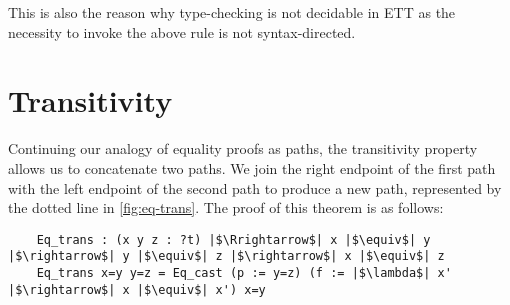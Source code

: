 \documentclass[12pt,twoside,maitrise]{dms}
\theoremstyle{definition}
\numberwithin{equation}{section}
\numberwithin{table}{chapter}
\numberwithin{figure}{chapter}
\begin{document}
\begin{prooftree*}
\end{prooftree*}

This is also the reason why type-checking is not decidable in ETT as the
necessity to invoke the above rule is not syntax-directed.

\section{Transitivity}\label{sec:eqtransitivity}
Continuing our analogy of equality proofs as paths, the transitivity property
allows us to concatenate two paths. We join the right endpoint of the first path
with the left endpoint of the second path to produce a new path, represented by
the dotted line in \autoref{fig:eq-trans}. The proof of this theorem is as
follows:

\begin{verbatim}
    Eq_trans : (x y z : ?t) |$\Rrightarrow$| x |$\equiv$| y |$\rightarrow$| y |$\equiv$| z |$\rightarrow$| x |$\equiv$| z
    Eq_trans x=y y=z = Eq_cast (p := y=z) (f := |$\lambda$| x' |$\rightarrow$| x |$\equiv$| x') x=y
\end{verbatim}
\end{document}
